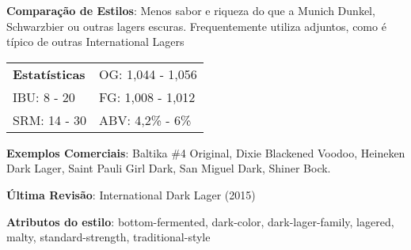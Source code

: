 \textbf{Comparação de Estilos}: Menos sabor e riqueza do que a Munich Dunkel, Schwarzbier ou outras lagers escuras. Frequentemente utiliza adjuntos, como é típico de outras International Lagers

\begin{tabular}{@{}p{35mm}p{35mm}@{}}
  \textbf{Estatísticas} & OG: 1,044 - 1,056 \\
  IBU: 8 - 20 & FG: 1,008 - 1,012 \\
  SRM: 14 - 30 & ABV: 4,2\% - 6\%
  \end{tabular}

\textbf{Exemplos Comerciais}: Baltika \#4 Original, Dixie Blackened Voodoo, Heineken Dark Lager, Saint Pauli Girl Dark, San Miguel Dark, Shiner Bock.

\textbf{Última Revisão}: International Dark Lager (2015)

\textbf{Atributos do estilo}: bottom-fermented, dark-color, dark-lager-family, lagered, malty, standard-strength, traditional-style

